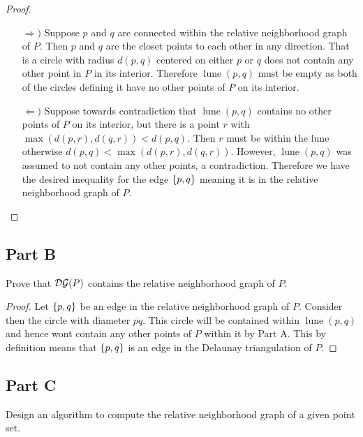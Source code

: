 \documentclass[12pt]{extarticle}
\DeclareMathOperator*{\lune}{lune}
\begin{document}
\begin{proof}
    \hfill
    \begin{enumerate}
        \item[$\Rightarrow)$]
            Suppose $p$ and $q$ are connected within the relative neighborhood graph of $P$. Then $p$ and $q$ are the closet points to each other in any direction. That is a circle with radius $d(p,q)$ centered on either $p$ or $q$ does not contain any other point in $P$ in its interior. Therefore $\lune(p,q)$ must be empty as both of the circles defining it have no other points of $P$ on its interior.
        \item[$\Leftarrow)$]
            Suppose towards contradiction that $\lune(p,q)$ contains no other points of $P$ on its interior, but there is a point $r$ with $\max(d(p,r), d(q,r)) < d(p,q)$. Then $r$ must be within the lune otherwise $d(p,q) < \max(d(p,r), d(q,r))$. However, $\lune(p,q)$ was assumed to not contain any other points, a contradiction. Therefore we have the desired inequality for the edge $\qty{p,q}$ meaning it is in the relative neighborhood graph of $P$.
    \end{enumerate}
\end{proof}

\subsection*{Part B}
Prove that $\mathcal{DG}(P)$ contains the relative neighborhood graph of $P$.
\begin{proof}
    Let $\qty{p,q}$ be an edge in the relative neighborhood graph of $P$. Consider then the circle with diameter $\overline{pq}$. This circle will be contained within $\lune(p,q)$ and hence wont contain any other points of $P$ within it by Part A. This by definition means that $\qty{p,q}$ is an edge in the Delaunay triangulation of $P$.
\end{proof}

\subsection*{Part C}
Design an algorithm to compute the relative neighborhood graph of a given point set.
\end{document}
